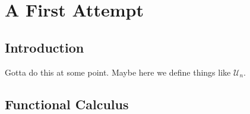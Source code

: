 \chapter{A First Attempt}\label{ch:FirstAttempt}


\section{Introduction}%
\label{sec:Intro}

{\color{blue} Gotta do this at some point. Maybe here we define things like \(\mathcal{U}_n\).}

\section{Functional Calculus}%
\label{sec:functionalcalc}

